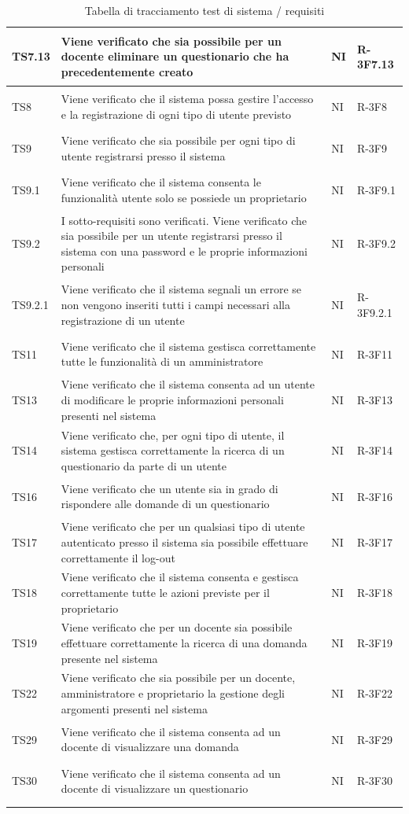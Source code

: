 \documentclass[12pt,a4paper]{article}
\begin{document}
\begin{longtable}{l p{10cm} l l}
		\midrule
		TS7.13 & Viene verificato che sia possibile per un docente eliminare un questionario che ha precedentemente creato & NI& \hypertarget{R-3F7.13}{R-3F7.13}\tabularnewline
		\midrule
		TS8 & Viene verificato che il sistema possa gestire l'accesso e la registrazione di ogni tipo di utente previsto & NI& \hypertarget{R-3F8}{R-3F8}\tabularnewline
		\midrule
		TS9 & Viene verificato che sia possibile per ogni tipo di utente registrarsi presso il sistema & NI& \hypertarget{R-3F9}{R-3F9}\tabularnewline
		\midrule
		TS9.1 & Viene verificato che il sistema consenta le funzionalità utente solo se possiede un proprietario & NI& \hypertarget{R-3F9.1}{R-3F9.1}\tabularnewline
		\midrule
		TS9.2 & I sotto-requisiti sono verificati. Viene verificato che sia possibile per un utente registrarsi presso il sistema con una password e le proprie informazioni personali & NI& \hypertarget{R-3F9.2}{R-3F9.2}\tabularnewline
		\midrule
		TS9.2.1 & Viene verificato che il sistema segnali un errore se non vengono inseriti tutti i campi necessari alla registrazione di un utente & NI& \hypertarget{R-3F9.2.1}{R-3F9.2.1}\tabularnewline
		\midrule
		TS11 & Viene verificato che il sistema gestisca correttamente tutte le funzionalità di un amministratore & NI& \hypertarget{R-3F11}{R-3F11}\tabularnewline
		\midrule
		TS13 & Viene verificato che il sistema consenta ad un utente di modificare le proprie informazioni personali presenti nel sistema & NI& \hypertarget{R-3F13}{R-3F13}\tabularnewline
		\midrule
		TS14 & Viene verificato che, per ogni tipo di utente, il sistema gestisca correttamente la ricerca di un questionario da parte di un utente & NI& \hypertarget{R-3F14}{R-3F14}\tabularnewline
		\midrule
		TS16 & Viene verificato che un utente sia in grado di rispondere alle domande di un questionario & NI& \hypertarget{R-3F16}{R-3F16}\tabularnewline
		\midrule
		TS17 & Viene verificato che per un qualsiasi tipo di utente autenticato presso il sistema sia possibile effettuare correttamente il log-out  & NI& \hypertarget{R-3F17}{R-3F17}\tabularnewline
		\midrule
		TS18 & Viene verificato che il sistema consenta e gestisca correttamente tutte le azioni previste per il proprietario & NI& \hypertarget{R-3F18}{R-3F18}\tabularnewline
		\midrule
		TS19 & Viene verificato che per un docente sia possibile effettuare correttamente la ricerca di una domanda presente nel sistema & NI& \hypertarget{R-3F19}{R-3F19}\tabularnewline
		\midrule
		TS22 & Viene verificato che sia possibile per un docente, amministratore e proprietario la gestione degli argomenti presenti nel sistema & NI& \hypertarget{R-3F22}{R-3F22}\tabularnewline
		\midrule
		TS29 & Viene verificato che il sistema consenta ad un docente di visualizzare una domanda & NI& \hypertarget{R-3F29}{R-3F29}\tabularnewline
		\midrule
		TS30 & Viene verificato che il sistema consenta ad un docente di visualizzare un questionario & NI& \hypertarget{R-3F30}{R-3F30}\tabularnewline
		\midrule
		\caption{Tabella di tracciamento test di sistema / requisiti} \tabularnewline
	\end{longtable}
\end{document}
